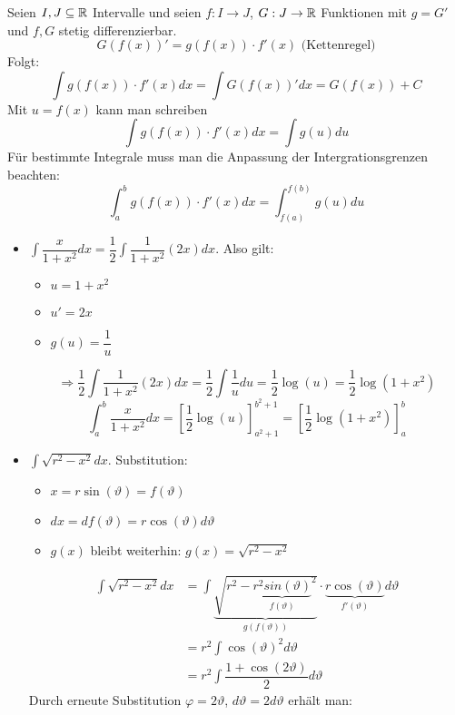 \documentclass[main.tex]{subfiles}
\begin{document}
\begin{Theorem}[Substitution]
  Seien $I,J \subseteq \mathbb{R}$ Intervalle und seien $f: I \to J$, $G: J \to \mathbb{R}$ Funktionen mit $g = G'$ und $f,G$ stetig differenzierbar.\\
  $$G(f(x))' = g(f(x))\cdot f'(x) \text{ (Kettenregel)}$$
  Folgt:
  $$\int g(f(x)) \cdot f'(x)dx = \int G(f(x))'dx = G(f(x)) + C$$
  Mit $u = f(x)$ kann man schreiben
  $$\int g(f(x)) \cdot f'(x)dx = \int g(u) du$$
  Für bestimmte Integrale muss man die Anpassung der Intergrationsgrenzen beachten:
  $$\int_a^b g(f(x)) \cdot f'(x)dx = \int_{f(a)}^{f(b)} g(u) du$$
\end{Theorem}

\begin{Beispiel}
  \begin{itemize}
    \item $\int \dfrac{x}{1+x^2}dx = \dfrac{1}{2}\int \dfrac{1}{1+x^2}(2x)dx$. Also gilt:
      \begin{itemize}
        \item $u = 1+x^2$
        \item $u' = 2x$
        \item $g(u) = \dfrac{1}{u}$
      \end{itemize}
      $$\Rightarrow \dfrac{1}{2}\int \dfrac{1}{1+x^2}(2x)dx = \dfrac{1}{2} \int \dfrac{1}{u} du = \dfrac{1}{2}\log(u) = \dfrac{1}{2}\log(1+x^2)$$
      $$\int_a^b \dfrac{x}{1+x^2}dx = \left[\dfrac{1}{2} \log(u)\right]_{a^2+1}^{b^2+1} = \left[\dfrac{1}{2} \log(1+x^2)\right]_a^b$$
    \item $\int \sqrt{r^2 - x^2} dx$. Substitution:
      \begin{itemize}
        \item $x = r \sin(\vartheta) = f(\vartheta)$
        \item $d x = df(\vartheta) = r \cos(\vartheta)d \vartheta$
        \item $g(x)$ bleibt weiterhin: $g(x) = \sqrt{r^2 - x^2}$
      \end{itemize}
      \begin{align*}
        \int\sqrt{r^2 - x^2}dx &= \int \underbrace{\sqrt{r^2 - {\underbrace{r^2 sin(\vartheta)}_{f(\vartheta)}}^2}}_{g(f(\vartheta))} \cdot \underbrace{r \cos(\vartheta)}_{f'(\vartheta)}d \vartheta\\
        &= r^2 \int \cos(\vartheta)^2 d \vartheta\\
        &= r^2 \int \dfrac{1 + \cos(2\vartheta)}{2} d \vartheta
      \end{align*}
      Durch erneute Substitution $\varphi = 2 \vartheta$, $d \vartheta = 2 d \vartheta$ erhält man:

\end{itemize}
\end{Beispiel}
\end{document}
